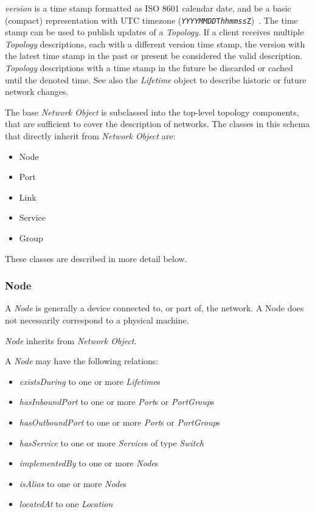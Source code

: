 \emph{version} is a time stamp formatted as ISO 8601 calendar date, and \MUST{} be a basic (compact) representation with UTC timezone (\texttt{\emph{YYYYMMDD}T\emph{hhmmss}Z})~\cite{iso8601}. The time stamp can be used to publish updates of a \emph{Topology}. 
If a client receives multiple \emph{Topology} descriptions, each with a different version time stamp, the version with the latest time stamp in the past or present \MUST{} be considered the valid description. \emph{Topology} descriptions with a time stamp in the future \MAY{} be discarded or cached until the denoted time. See also the \emph{Lifetime} object to describe historic or future network changes.

The base \emph{Network Object} is subclassed into the top-level topology
components, that are sufficient to cover the description of networks.  The
classes in this schema that directly inherit from \emph{Network Object} are:

\begin{itemize}
    \item Node
    \item Port
    \item Link
    \item Service
    \item Group
\end{itemize}

These classes are described in more detail below.


\subsubsection{Node}%
\label{class:node}

A \emph{Node} is generally a device connected to, or part of, the network.  A
Node does not necessarily correspond to a physical machine.

\emph{Node} inherits from \emph{Network Object}.

A \emph{Node} may have the following relations:
\begin{itemize}
    \item \emph{existsDuring} to one or more \emph{Lifetime}s
    \item \emph{hasInboundPort} to one or more \emph{Port}s or \emph{PortGroup}s
    \item \emph{hasOutboundPort} to one or more \emph{Port}s or \emph{PortGroup}s
    \item \emph{hasService} to one or more \emph{Service}s of type \emph{Switch}
    \item \emph{implementedBy} to one or more \emph{Node}s
    \item \emph{isAlias} to one or more \emph{Node}s
    \item \emph{locatedAt} to one \emph{Location} 
\end{itemize}

